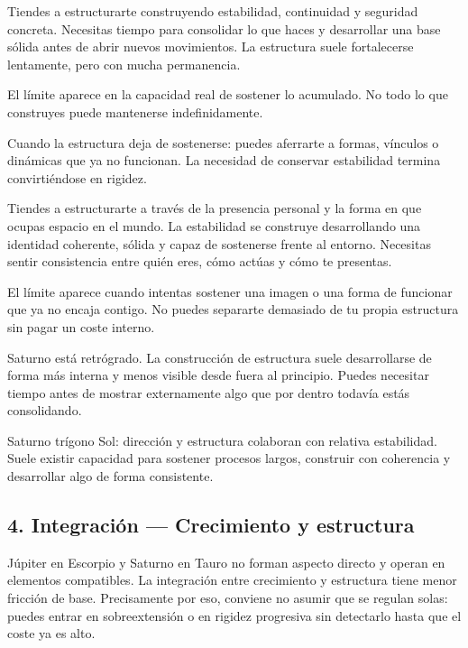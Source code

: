 \documentclass[11pt,a4paper]{article}
\begin{document}
Tiendes a estructurarte construyendo estabilidad, continuidad y seguridad concreta. Necesitas tiempo para consolidar lo que haces y desarrollar una base sólida antes de abrir nuevos movimientos. La estructura suele fortalecerse lentamente, pero con mucha permanencia.

El límite aparece en la capacidad real de sostener lo acumulado. No todo lo que construyes puede mantenerse indefinidamente.

Cuando la estructura deja de sostenerse: puedes aferrarte a formas, vínculos o dinámicas que ya no funcionan. La necesidad de conservar estabilidad termina convirtiéndose en rigidez.

Tiendes a estructurarte a través de la presencia personal y la forma en que ocupas espacio en el mundo. La estabilidad se construye desarrollando una identidad coherente, sólida y capaz de sostenerse frente al entorno. Necesitas sentir consistencia entre quién eres, cómo actúas y cómo te presentas.

El límite aparece cuando intentas sostener una imagen o una forma de funcionar que ya no encaja contigo. No puedes separarte demasiado de tu propia estructura sin pagar un coste interno.

Saturno está retrógrado. La construcción de estructura suele desarrollarse de forma más interna y menos visible desde fuera al principio. Puedes necesitar tiempo antes de mostrar externamente algo que por dentro todavía estás consolidando.

Saturno trígono Sol: dirección y estructura colaboran con relativa estabilidad. Suele existir capacidad para sostener procesos largos, construir con coherencia y desarrollar algo de forma consistente.

\vspace{0.8cm}


\subsection{4. Integración — Crecimiento y estructura}

Júpiter en Escorpio y Saturno en Tauro no forman aspecto directo y operan en elementos compatibles. La integración entre crecimiento y estructura tiene menor fricción de base. Precisamente por eso, conviene no asumir que se regulan solas: puedes entrar en sobreextensión o en rigidez progresiva sin detectarlo hasta que el coste ya es alto.
\end{document}
